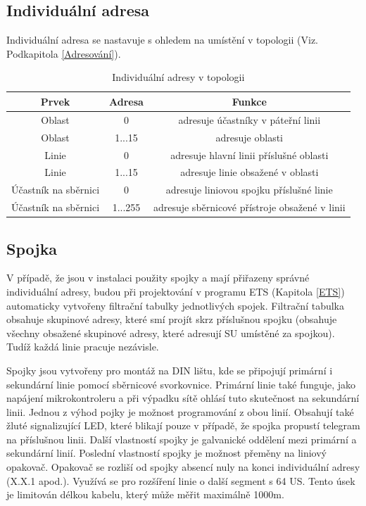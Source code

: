 \newpage
\subsection{Individuální adresa}
Individuální adresa se nastavuje s ohledem na umístění v topologii (Viz. Podkapitola \ref{Adresování}).
\begin{table}[h]
 \caption[Individuální adresy v topologii \cite{Topologie}]{Individuální adresy v topologii \cite{Topologie}}
   \small
    \centering
	  \begin{tabular}{|c|c|c|}
	    \hline
	    Prvek & Adresa & Funkce  \\
	    \hline\hline
	    Oblast & 0 & adresuje účastníky v páteřní linii \\
	    \hline
	    Oblast & 1...15 & adresuje oblasti \\
	    \hline
	    Linie & 0 & adresuje hlavní linii příslušné oblasti \\
	    \hline
	    Linie & 1...15 & adresuje linie obsažené v oblasti\\ 
	    \hline
	    Účastník na sběrnici & 0 & adresuje liniovou spojku příslušné linie \\
	    \hline
	    Účastník na sběrnici & 1...255 & adresuje sběrnicové přístroje obsažené v linii \\
	    \hline
	  \end{tabular}
\end{table}
\newpage
\subsection{Spojka}
V případě, že jsou v instalaci použity spojky a mají přiřazeny správné individuální adresy, budou při projektování v programu ETS (Kapitola \ref{ETS}) automaticky vytvořeny filtrační tabulky jednotlivých spojek. Filtrační tabulka obsahuje skupinové adresy, které smí projít skrz příslušnou spojku (obsahuje všechny obsažené skupinové adresy, které adresují SU umístěné za spojkou). Tudíž každá linie pracuje nezávisle.

 Spojky jsou vytvořeny pro montáž na DIN lištu, kde se připojují primární i sekundární linie pomocí sběrnicové svorkovnice. Primární linie také funguje, jako napájení mikrokontroleru a při výpadku sítě ohlásí tuto skutečnost na sekundární linii. Jednou z výhod pojky je možnost programování z obou linií. Obsahují také žluté signalizující LED, které blikají pouze v případě, že spojka propustí telegram na příslušnou linii. Další vlastností spojky je galvanické oddělení mezi primární a sekundární linií. Poslední vlastností spojky je možnost přeměny na liniový opakovač. Opakovač se rozliší od spojky absencí nuly na konci individuální adresy (X.X.1 apod.). Využívá se pro rozšíření linie o další segment s 64 US. Tento úsek je limitován délkou kabelu, který může měřit maximálně 1000m. \cite{Topologie}
 
